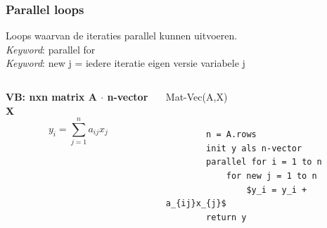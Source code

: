 \documentclass
   [kulak] %
   {kulakbeamer}
\begin{document}
\begin{frame}[fragile]
\frametitle{Parallel loops}

Loops waarvan de iteraties parallel kunnen uitvoeren. \\ \textit{Keyword}: parallel for\\
\textit{Keyword}: new j = iedere iteratie eigen versie variabele j

\pause

\begin{columns}[T] %
	
	
	
	\begin{column}{.3\textwidth}
		\begin{minipage}[c][.6\textheight][c]{\linewidth}
				
			\textbf{VB: nxn matrix A $\cdot$ n-vector X}
			\\
			\[
			y_i = \sum_{j=1}^n a_{ij}x_{j}
			\]
			
		\end{minipage}
	\end{column}
	
	
	
	\begin{column}{.65\textwidth}
		
		Mat-Vec(A,X)
		\begin{lstlisting}[style=CStyle]
		
		n = A.rows
		init y als n-vector
		parallel for i = 1 to n
			for new j = 1 to n
				$y_i = y_i + a_{ij}x_{j}$
		return y
		\end{lstlisting}
		
	\end{column}
	
	
	
	
	
\end{columns}

\end{frame}
\end{document}
